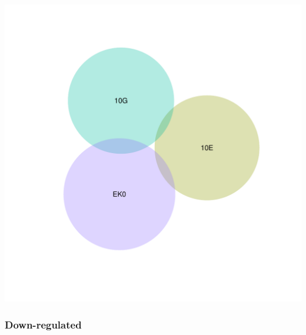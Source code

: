 \documentclass{article}\usepackage[]{graphicx}\usepackage[]{color}
\newenvironment{knitrout}{}{} %
\begin{document}
\begin{knitrout}
\color{fgcolor}

{\centering \includegraphics[width=1\linewidth,height=.4\textheight]{figure/minimal-venn_t1_3fc_up_euler-1} 

}



\end{knitrout}
\clearpage
\subsubsection{Down-regulated}
\end{document}
